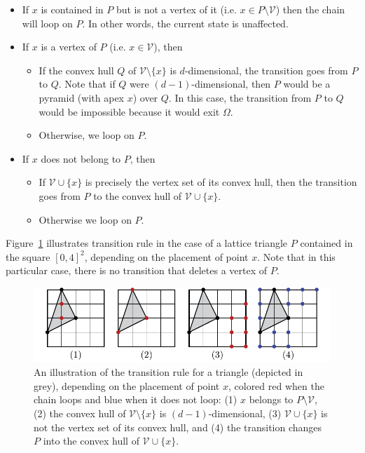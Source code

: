 \documentclass[a4paper]{article}
\begin{document}
\begin{itemize}
\item If $x$ is contained in $P$ but is not a vertex of it (i.e. $x\in{P}\mathord{\setminus}\mathcal{V}$) then the chain will loop on $P$. In other words, the current state is unaffected.
\item If $x$ is a vertex of $P$ (i.e. $x\in\mathcal{V}$), then
  \begin{itemize}
    \item If the convex hull $Q$ of $\mathcal{V}\mathord{\setminus}\{x\}$ is $d$-dimensional, the transition goes from $P$ to $Q$. Note that if $Q$ were $(d-1)$-dimensional, then $P$ would be a pyramid (with apex $x$) over $Q$. In this case, the transition from $P$ to $Q$ would be impossible because it would exit $\Omega$.
    \item Otherwise, we loop on $P$.
  \end{itemize}
  \item If $x$ does not belong to $P$, then
  \begin{itemize}
    \item If $\mathcal{V}\cup\{x\}$ is precisely the vertex set of its convex hull, then the transition goes from $P$ to the convex hull of $\mathcal{V}\cup \{x\}$.
    \item Otherwise we loop on $P$.
  \end{itemize}
\end{itemize}

Figure~\ref{fig:boucle} illustrates transition rule in the case of a lattice triangle $P$ contained in the square $[0,4]^2$, depending on the placement of point $x$. Note that in this particular case, there is no transition that deletes a vertex of $P$.

\begin{figure}[b]
  \begin{center}
    \includegraphics[scale=0.9]{boucle-mod}
    \caption{An illustration of the transition rule for a triangle (depicted in grey), depending on the placement of point $x$, colored red when the chain loops and blue when it does not loop: (1) $x$ belongs to $P\mathord{\setminus}\mathcal{V}$, (2) the convex hull of $\mathcal{V}\mathord{\setminus}\{x\}$ is $(d-1)$-dimensional, (3) $\mathcal{V}\cup\{x\}$ is not the vertex set of its convex hull, and (4) the transition changes $P$ into the convex hull of $\mathcal{V}\cup\{x\}$.}
    \label{fig:boucle}
  \end{center}
\end{figure}
\end{document}
